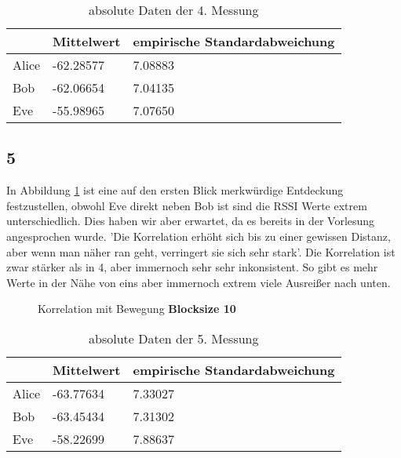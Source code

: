 \documentclass[12pt,a4paper]{article}
\begin{document}
\begin{table}[H]
\centering
\begin{tabular}{l|l|l}
& Mittelwert & empirische Standardabweichung \\
\hline
Alice & -62.28577 & 7.08883 \\
\hline
Bob & -62.06654 & 7.04135 \\
\hline
Eve & -55.98965 & 7.07650 \\
\end{tabular}
\caption{absolute Daten der 4. Messung}
\end{table}

\subsection*{5}
In Abbildung \ref{fig:5} ist eine auf den ersten Blick merkwürdige Entdeckung festzustellen, obwohl Eve direkt neben Bob ist sind die RSSI Werte extrem unterschiedlich. Dies haben wir aber erwartet, da es bereits in der Vorlesung angesprochen wurde. 'Die Korrelation erhöht sich bis zu einer gewissen Distanz, aber wenn man näher ran geht, verringert sie sich sehr stark'. Die Korrelation ist zwar stärker als in 4, aber immernoch sehr sehr inkonsistent. So gibt es mehr Werte in der Nähe von eins aber immernoch extrem viele Ausreißer nach unten.
\begin{figure}[H]
\centering
{} \qquad
{}
\caption{Korrelation mit Bewegung \textbf{Blocksize 10}}
\label{fig:5}
\end{figure}

\begin{table}[H]
\centering
\begin{tabular}{l|l|l}
& Mittelwert & empirische Standardabweichung \\
\hline
Alice & -63.77634 & 7.33027 \\
\hline
Bob & -63.45434 & 7.31302 \\
\hline
Eve & -58.22699 & 7.88637 \\
\end{tabular}
\caption{absolute Daten der 5. Messung}
\end{table}
\end{document}
